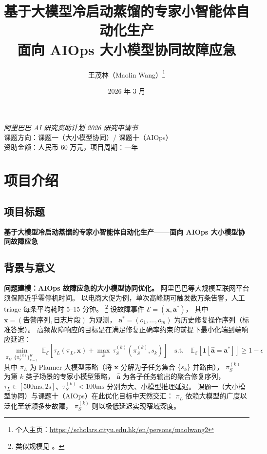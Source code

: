 \documentclass[lang=cn,a4paper,newtx,bibend=bibtex]{elegantpaper}
\title{基于大模型冷启动蒸馏的专家小智能体自动化生产\\[6pt]
       {\large 面向 AIOps 大小模型协同故障应急}}
\author{王茂林（Maolin Wang）\thanks{\email{maolwang2@cityu.edu.hk} \quad
        个人主页：\url{https://scholars.cityu.edu.hk/en/persons/maolwang2}}}
\institute{香港城市大学~~计算机科学系}
\date{2026 年 3 月}
\begin{document}
\maketitle

\begin{center}
  \textit{阿里巴巴 AI 研究资助计划 2026 \quad 研究申请书}\\[3pt]
  课题方向：课题一（大小模型协同）/ 课题十（AIOps）\\[2pt]
  \small 资助金额：人民币 60 万元，项目周期：一年
\end{center}

\vspace{8pt}

\section{项目介绍}

\subsection{项目标题}

\textbf{基于大模型冷启动蒸馏的专家小智能体自动化生产——面向 AIOps 大小模型协同故障应急}

\subsection{背景与意义}

\textbf{问题建模：AIOps 故障应急的大小模型协同优化。}
阿里巴巴等大规模互联网平台须保障近乎零停机时间。
以电商大促为例，单次高峰期可触发数万条告警，人工 triage 每条平均耗时 5--15 分钟。%
\footnote{类似规模见 \textcite{aiops}。}
设故障事件 $\mathcal{E} = (\mathbf{x},\mathbf{a}^{*})$，
其中 $\mathbf{x} = (\text{告警序列},\text{日志片段})$ 为观测，
$\mathbf{a}^{*} = (o_1,\ldots,o_m)$ 为历史修复操作序列（标准答案）。
高频故障响应的目标是在满足修复正确率约束的前提下最小化端到端响应延迟：
\begin{equation}
  \min_{\pi_L,\,\{\pi_S^{(k)}\}_{k=1}^K}
  \;\mathbb{E}_{\mathcal{E}}\!\left[
    \tau_L\!\left(\pi_L,\mathbf{x}\right)
    +\max_k\,\tau_S^{(k)}\!\left(\pi_S^{(k)},s_k\right)
  \right]
  \quad\text{s.t.}\quad
  \mathbb{E}_{\mathcal{E}}\!\left[\mathbf{1}[\hat{\mathbf{a}}=\mathbf{a}^{*}]\right]\geq 1-\epsilon
  \label{eq:obj}
\end{equation}
其中 $\pi_L$ 为 Planner 大模型策略（将 $\mathbf{x}$ 分解为子任务集合 $\{s_k\}$ 并路由），
$\pi_S^{(k)}$ 为第 $k$ 类子场景的专家小模型策略，
$\hat{\mathbf{a}}$ 为各子任务输出的聚合修复序列，
$\tau_L \!\in\! [500\text{ms},2\text{s}]$、$\tau_S^{(k)}\!<\!100\text{ms}$
分别为大、小模型推理延迟。
课题一（大小模型协同）与课题十（AIOps）在此优化目标中天然交汇：
$\pi_L$ 依赖大模型的广度以泛化至新颖多步故障，
$\pi_S^{(k)}$ 则以极低延迟实现窄域深度。
\end{document}
